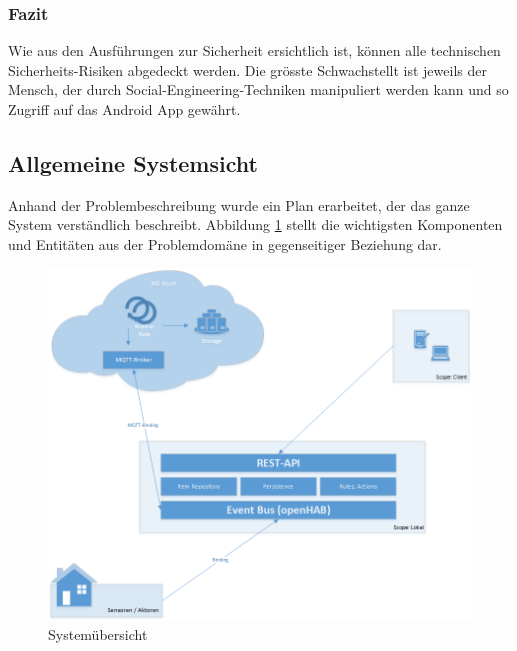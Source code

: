 \subsubsection{Fazit}
Wie aus den Ausführungen zur Sicherheit ersichtlich ist, können alle technischen Sicherheits-Risiken abgedeckt werden. Die grösste Schwachstellt ist jeweils der Mensch, der durch Social-Engineering-Techniken manipuliert werden kann und so Zugriff auf das Android App gewährt.

\subsection{Allgemeine Systemsicht}
Anhand der Problembeschreibung wurde ein Plan erarbeitet, der das ganze System verständlich beschreibt. Abbildung \ref{fig:systemView} stellt die wichtigsten Komponenten und Entitäten aus der Problemdomäne in gegenseitiger Beziehung dar.

\begin{figure}[h!]
	\centering
		\includegraphics[scale=0.55]{report/img/systemuebersicht}
	\caption{Systemübersicht}
	\label{fig:systemView}
\end{figure}

\pagebreak